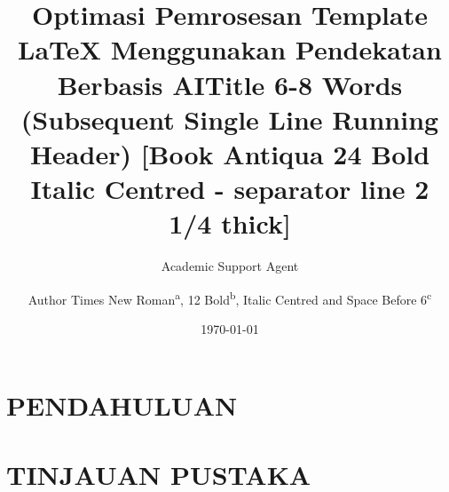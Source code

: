 \documentclass{RDJ}
\title{Optimasi Pemrosesan Template LaTeX Menggunakan Pendekatan Berbasis AI}
\author{Academic Support Agent}
\date{\today}
\begin{document}
\maketitle

\begin{abstract}

\end{abstract}

\chapter{PENDAHULUAN}


\chapter{TINJAUAN PUSTAKA}



\usepackage{fixltx2e}%
\usepackage{nicefrac}
\usepackage[symbol]{footmisc}
\usepackage{url}
\makeatletter
    \g@addto@macro{\UrlBreaks}{\UrlOrds}
\makeatother

\setcounter{page}{42}%

\title{Title 6-8 Words (Subsequent Single Line Running Header) [Book Antiqua 24 Bold Italic Centred - separator line 2 1/4 thick]}
\makeatletter
\let\thetile\@title
\makeatother
{}

\author{Author Times New Roman\textsuperscript{a}, 12 Bold\textsuperscript{b}, Italic Centred and Space Before 6\textsuperscript{c}}
\end{document}
